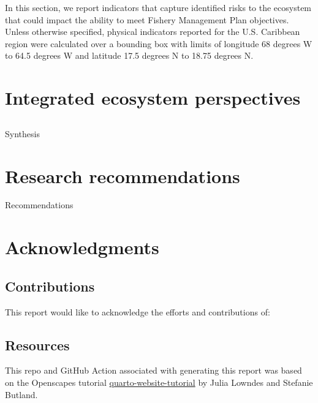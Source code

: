 \documentclass[
  letterpaper,
  oneside,
  open=any]{scrbook}
\begin{document}
In this section, we report indicators that capture identified risks to
the ecosystem that could impact the ability to meet Fishery Management
Plan objectives. Unless otherwise specified, physical indicators
reported for the U.S. Caribbean region were calculated over a bounding
box with limits of longitude 68 degrees W to 64.5 degrees W and latitude
17.5 degrees N to 18.75 degrees N.


\chapter{Integrated ecosystem
perspectives}\label{integrated-ecosystem-perspectives}

\section*{}\label{section}

\markright{}

Synthesis


\chapter{Research recommendations}\label{research-recommendations}

Recommendations


\chapter{Acknowledgments}\label{acknowledgments}

\section{Contributions}\label{contributions}

This report would like to acknowledge the efforts and contributions of:

\section{Resources}\label{resources}

This repo and GitHub Action associated with generating this report was
based on the Openscapes tutorial
\href{https://github.com/Openscapes/quarto-website-tutorial}{quarto-website-tutorial}
by Julia Lowndes and Stefanie Butland.
\end{document}
